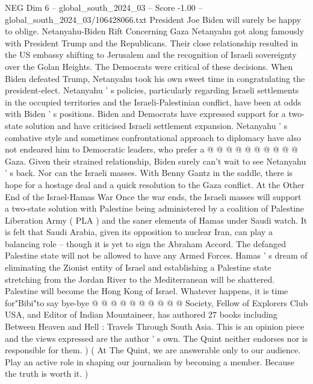 \begin{textsample}{NEG Dim 6 – global\_south\_2024\_03 – Score -1.00 – global\_south\_2024\_03/106428066.txt}
President Joe Biden will surely be happy to oblige.
Netanyahu-Biden Rift Concerning Gaza Netanyahu got along famously with President Trump and the Republicans.
Their close relationship resulted in the US embassy shifting to Jerusalem and the recognition of Israeli sovereignty over the Golan Heights.
The Democrats were critical of these decisions.
When Biden defeated Trump, Netanyahu took his own sweet time in congratulating the president-elect.
Netanyahu ' s policies, particularly regarding Israeli settlements in the occupied territories and the Israeli-Palestinian conflict, have been at odds with Biden ' s positions.
Biden and Democrats have expressed support for a two-state solution and have criticised Israeli settlement expansion.
Netanyahu ' s combative style and sometimes confrontational approach to diplomacy have also not endeared him to Democratic leaders, who prefer a @ @ @ @ @ @ @ @ @ @ Gaza.
Given their strained relationship, Biden surely can't wait to see Netanyahu ' s back.
Nor can the Israeli masses.
With Benny Gantz in the saddle, there is hope for a hostage deal and a quick resolution to the Gaza conflict.
At the Other End of the Israel-Hamas War Once the war ends, the Israeli masses will support a two-state solution with Palestine being administered by a coalition of Palestine Liberation Army ( PLA ) and the saner elements of Hamas under Saudi watch.
It is felt that Saudi Arabia, given its opposition to nuclear Iran, can play a balancing role -- though it is yet to sign the Abraham Accord.
The defanged Palestine state will not be allowed to have any Armed Forces.
Hamas ' s dream of eliminating the Zionist entity of Israel and establishing a Palestine state stretching from the Jordan River to the Mediterranean will be shattered.
Palestine will become the Hong Kong of Israel.
Whatever happens, it is time for"Bibi"to say bye-bye @ @ @ @ @ @ @ @ @ @ Society, Fellow of Explorers Club USA, and Editor of Indian Mountaineer, has authored 27 books including Between Heaven and Hell : Travels Through South Asia.
This is an opinion piece and the views expressed are the author ' s own.
The Quint neither endorses nor is responsible for them. ) ( At The Quint, we are answerable only to our audience.
Play an active role in shaping our journalism by becoming a member.
Because the truth is worth it. )

\end{textsample}
